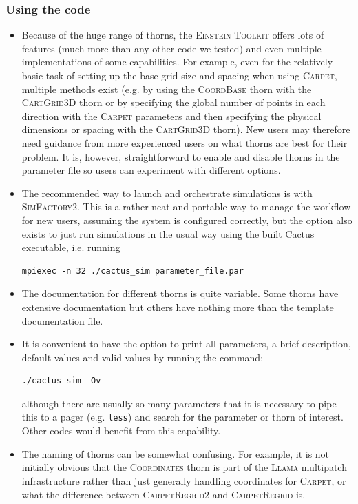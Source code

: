 \documentclass[12pt,a4paper]{article}
\numberwithin{figure}{subsection}
\newcommand{\einsteintoolkit}{\textsc{Einstein Toolkit}\xspace}
\newcommand{\carpet}{\textsc{Carpet}\xspace}
\begin{document}
\subsubsection{Using the code}
\begin{itemize}
    \item Because of the huge range of thorns, the \einsteintoolkit offers lots
    of features (much more than any other code we tested) and even multiple
    implementations of some capabilities.
    For
    example, even for the relatively basic task of setting up the base grid size
    and spacing when using \carpet, multiple methods exist (e.g. by using the \textsc{CoordBase} thorn
    with the \textsc{CartGrid3D} thorn or by specifying the global number of
    points in each direction with the \carpet parameters and then specifying the
    physical dimensions or spacing with the \textsc{CartGrid3D} thorn).
    New users may therefore need guidance from more experienced users on what thorns are best
    for their problem.
    It is, however, straightforward to enable and disable thorns in the parameter file 
    so users can experiment with different options. 

    \item
    The recommended way to launch and orchestrate simulations is with
    \textsc{SimFactory2}. This is a rather neat and portable way to manage the
    workflow for new users, assuming the system is configured correctly, but the 
    option also exists to just run
    simulations in the usual way using the built Cactus executable, i.e. running
    \begin{lstlisting}[style=shortcode]
        mpiexec -n 32 ./cactus_sim parameter_file.par
    \end{lstlisting}
    \item The documentation for different thorns is quite variable. Some thorns
    have extensive documentation but others have nothing more than the template
    documentation file.
    \item It is convenient to have the option to print all parameters, a brief
    description, default values and valid values by running the command:
    \begin{lstlisting}[style=shortcode]
        ./cactus_sim -Ov
    \end{lstlisting}
    although there are usually so many parameters that it is necessary to
    pipe this to a pager (e.g. \texttt{less}) and search for the parameter or thorn of
    interest. Other codes would benefit from this capability.
    \item The naming of
    thorns can be somewhat confusing. For example, it is not initially obvious
    that the \textsc{Coordinates} thorn is part of the \textsc{Llama} multipatch
    infrastructure rather than just generally handling coordinates for
    \carpet, or what the difference between \textsc{CarpetRegrid2} and
    \textsc{CarpetRegrid} is.
\end{itemize}
\end{document}
